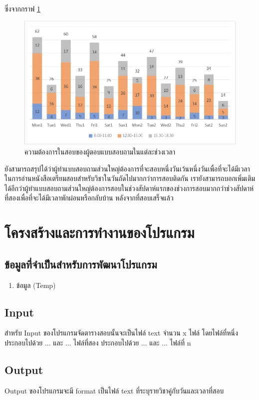 ซึ่งจากกราฟ \ref{fig:time_slot} 
\begin{figure}
  \begin{center}
    \includegraphics[width=\linewidth]{images/bar_chart_for_final_exam_slot.png}
  \end{center}
  \caption[Poem]{ความต้องการในสอบของผู้ตอบแบบสอบถามในแต่ละช่วงเวลา}
  \label{fig:time_slot}     
\end{figure}
ยังสามารถสรุปได้ว่าผู้ทำแบบสอบถามส่วนใหญ่ต้องการที่จะสอบหนึ่งวันเว้นหนึ่งวันเพื่อที่จะได้มีเวลาในการอ่านหนังสือเตรียมสอบสำหรับวิชาในวันถัดไปมากกว่าการสอบติดกัน 
เรายังสามารถบอกเพิ่มเติมได้อีกว่าผู้ทำแบบสอบถามส่วนใหญ่ต้องการสอบในช่วงสัปดาห์แรกของช่วงการสอบมากกว่าช่วงสัปดาห์ที่สองเพื่อที่จะได้มีเวลาพักผ่อนหรือกลับบ้าน หลังจากที่สอบเสร็จแล้ว

\section{โครงสร้างและการทำงานของโปรแกรม}
\subsection{ข้อมูลที่จำเป็นสำหรับการพัฒนาโปรแกรม}
\begin{enumerate}
  \item  ข้อมูล (Temp)
\end{enumerate}
\subsection{Input}
สำหรับ Input ของโปรแกรมจัดตารางสอบนั้นจะเป็นไฟล์ text จำนวน x ไฟล์ โดยไฟล์ที่หนึ่งประกอบไปด้วย ... และ ... 
ไฟล์ที่สอง ประกอบไปด้วย ... และ ...
ไฟล์ที่ n
\subsection{Output}
Output ของโปรแกรมจะมี format เป็นไฟล์ text ที่ระบุรายวิชาคู่กับวันและเวลาที่สอบ




